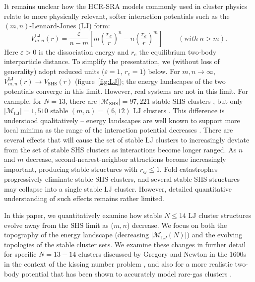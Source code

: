 It remains unclear how the HCR-SRA models commonly
used in cluster physics relate to more physically relevant, softer interaction potentials such
as the $(m,n)$-Lennard-Jones (LJ) form:
\begin{equation}
V_{m,n}^\mathrm{LJ}(r)=\frac{\varepsilon}{n-m}\left[m\left(\frac{r_e}{r}\right)^{n}-n\left(\frac{r_e}{r}\right)^{m}\right] \ \ \ \ \ \ \ \ \ \  ({\mathrm with}\ n > m).
\label{eqn:nmpot}
\end{equation}
Here $\varepsilon>0$ is the dissociation energy and $r_e$ the equilibrium
two-body interparticle distance. To simplify the presentation,
we (without loss of generality) adopt reduced units ($\varepsilon=1$, $r_e=1$) below.
For $m,n\rightarrow \infty$,
$V_{m,n}^\mathrm{LJ}(r) \rightarrow V_\mathrm{SHS}(r)$ (figure~\ref{fig:LJ}); the
energy landscapes of the two potentials converge in this limit.  However, real
systems are not in this limit.  For example, for $N = 13$, there are $|\mathcal{M}_\mathrm{SHS}|=97,221$
stable \ac{SHS} clusters \autocite{Hoy_Structuredynamicsmodel_2015,Holmes-Cerfon_EnumeratingRigidSphere_2016},
but only $|\mathcal{M}_\mathrm{LJ}|=1,510$ stable $(m,n) = (6,12)$ LJ clusters \autocite{Doye_Evolutionpotentialenergy_1999}.  
This difference is understood qualitatively -- energy landscapes are well known to support more
local minima
as the range of the interaction potential decreases \autocite{braier90,Wales_MicroscopicBasisGlobal_2001}.
There are several effects that will cause the set of
stable LJ clusters to increasingly deviate from the set of stable \ac{SHS} clusters
as interactions become longer ranged.  As $n$ and $m$ decrease,
second-nearest-neighbor attractions become increasingly important,
producing stable structures with $r_{ij} \leq 1$.  Fold catastrophes
\autocite{Wales_MicroscopicBasisGlobal_2001,wales04} progressively eliminate stable \ac{SHS} clusters, and several stable \ac{SHS}
structures may collapse into a single stable LJ cluster.  However,
detailed quantitative understanding of such effects remains rather limited.

In this paper, we quantitatively examine how stable $N \leq 14$ LJ cluster
structures evolve away from the \ac{SHS} limit as ($m, n$) decrease.  We focus on
both the topography of the energy landscape (decreasing
$|\mathcal{M}_{\mathrm LJ}(N)|$) and the evolving topologies of the stable cluster sets.
We examine these changes in further detail for specific $N = 13-14$ clusters discussed by
Gregory and Newton in the 1600s in the context of the kissing number problem
\autocite{Schutte_ProblemdreizehnKugeln_1952}, and also for a more realistic two-body potential that has
been shown to accurately model rare-gas clusters \autocite{Schwerdtfeger_ExtensionLennardJonespotential_2006}.





